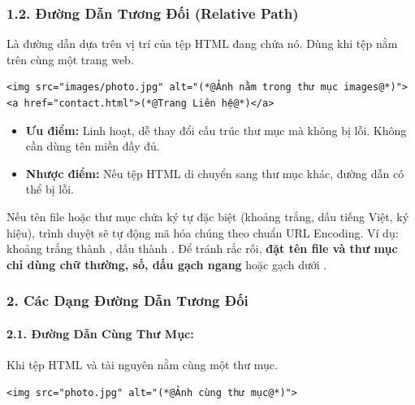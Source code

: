 \subsubsection*{1.2. Đường Dẫn Tương Đối (Relative Path)}

Là đường dẫn dựa trên vị trí của tệp HTML đang chứa nó. Dùng khi tệp nằm trên cùng một trang web.

\begin{codeWindow}
\begin{lstlisting}[language=HTML5]
<img src="images/photo.jpg" alt="(*@Ảnh nằm trong thư mục images@*)">
<a href="contact.html">(*@Trang Liên hệ@*)</a>
\end{lstlisting}
\end{codeWindow}

\begin{itemize}[leftmargin=1.5em, itemsep=2pt, parsep=0pt]
    \item \textbf{Ưu điểm:} Linh hoạt, dễ thay đổi cấu trúc thư mục mà không bị lỗi. Không cần dùng tên miền đầy đủ.
    \item \textbf{Nhược điểm:} Nếu tệp HTML di chuyển sang thư mục khác, đường dẫn có thể bị lỗi.
\end{itemize}

\begin{noteBox}
Nếu tên file hoặc thư mục chứa ký tự đặc biệt (khoảng trắng, dấu tiếng Việt, ký hiệu), trình duyệt sẽ tự động mã hóa chúng theo chuẩn URL Encoding. Ví dụ: khoảng trắng thành , dấu \codeinline{\&} thành . Để tránh rắc rối, \textbf{đặt tên file và thư mục chỉ dùng chữ thường, số, dấu gạch ngang} \codeinline{-} hoặc gạch dưới \codeinline{\_}.
\end{noteBox}

\subsubsection{2. Các Dạng Đường Dẫn Tương Đối}

\paragraph{2.1. Đường Dẫn Cùng Thư Mục:}
Khi tệp HTML và tài nguyên nằm cùng một thư mục.

\begin{codeWindow}
\begin{lstlisting}[language=HTML5]
<img src="photo.jpg" alt="(*@Ảnh cùng thư mục@*)">
\end{lstlisting}
\end{codeWindow}

